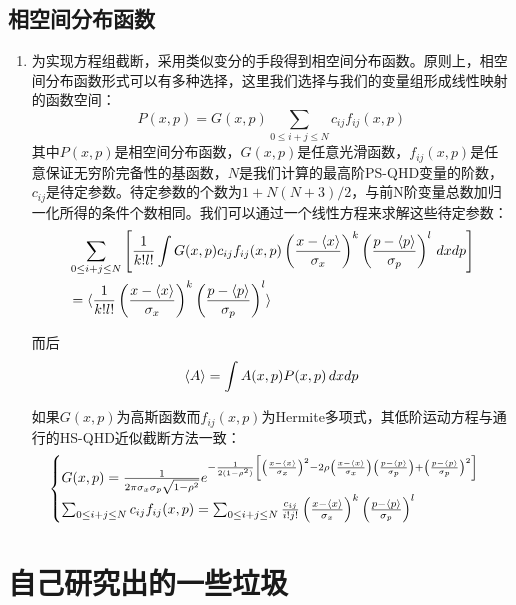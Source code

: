 \subsection{相空间分布函数}
\begin{enumerate}
	\item 为实现方程组截断，采用类似变分的手段得到相空间分布函数。原则上，相空间分布函数形式可以有多种选择，这里我们选择与我们的变量组形成线性映射的函数空间：
	\begin{equation}
	P(x,p)=G(x,p)\sum_{0 \leq i+j \leq N} c_{ij} f_{ij} (x,p)
	\end{equation}
	其中$P(x,p)$是相空间分布函数，$G(x,p)$是任意光滑函数，$f_{ij}(x,p)$是任意保证无穷阶完备性的基函数，$N$是我们计算的最高阶PS-QHD变量的阶数，$c_{ij}$是待定参数。待定参数的个数为$1+N(N+3)/2$，与前N阶变量总数加归一化所得的条件个数相同。我们可以通过一个线性方程来求解这些待定参数：
	\begin{align*}
	&\sum_{0\leq i+j\leq N}\left[\frac{1}{k!l!}\int G(x,p)c_{ij}f_{ij}(x,p)\left(\frac{x-\langle x \rangle}{\sigma_x}\right)^{k}\left(\frac{p-\langle p \rangle}{\sigma_p}\right)^{l}\,dxdp\right]\\
	&=\langle \frac{1}{k!l!}\left(\frac{x-\langle x \rangle}{\sigma_x}\right)^{k}\left(\frac{p-\langle p \rangle}{\sigma_p}\right)^{l} \rangle
	\end{align*}

	而后
	\begin{equation}
	\langle A \rangle=\int A(x,p) P(x,p) \, dxdp
	\end{equation}

	如果$G(x,p)$为高斯函数而$f_{ij}(x,p)$为Hermite多项式，其低阶运动方程与通行的HS-QHD近似截断方法一致：
	\begin{equation}
	\begin{cases}
	G(x,p)=\frac{1}{2\pi \sigma_x\sigma_p\sqrt{1-\rho^2}}e^{-\frac{1}{2(1-\rho^2)}\left[\left(\frac{x-\langle x \rangle}{\sigma_x}\right)^2-2\rho\left(\frac{x-\langle x \rangle}{\sigma_x}\right)\left(\frac{p-\langle p \rangle}{\sigma_p}\right)+\left(\frac{p-\langle p \rangle}{\sigma_p}\right)^2\right]}\\
	\sum_{0\leq i+j \leq N}c_{ij}f_{ij}(x,p)=\sum_{0\leq i+j \leq N}\frac{c_{ij}}{i!j!}\left(\frac{x-\langle x \rangle}{\sigma_x}\right)^{k}\left(\frac{p-\langle p \rangle}{\sigma_p}\right)^{l}
	\end{cases}
	\end{equation}
\end{enumerate}

\section{自己研究出的一些垃圾}

